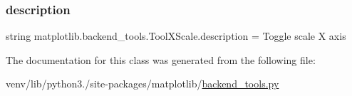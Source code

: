 \mbox{\label{classmatplotlib_1_1backend__tools_1_1ToolXScale_a350c1b538b8873f1e4e2689fb9d27cc9}} 
\subsubsection{\texorpdfstring{description}{description}}
{\footnotesize\ttfamily string matplotlib.\+backend\+\_\+tools.\+Tool\+X\+Scale.\+description = \textquotesingle{}Toggle scale X axis\textquotesingle{}\hspace{0.3cm}{\ttfamily [static]}}



The documentation for this class was generated from the following file\+:\begin{DoxyCompactItemize}
\item 
venv/lib/python3./site-\/packages/matplotlib/\hyperlink{backend__tools_8py}{backend\+\_\+tools.\+py}\end{DoxyCompactItemize}
